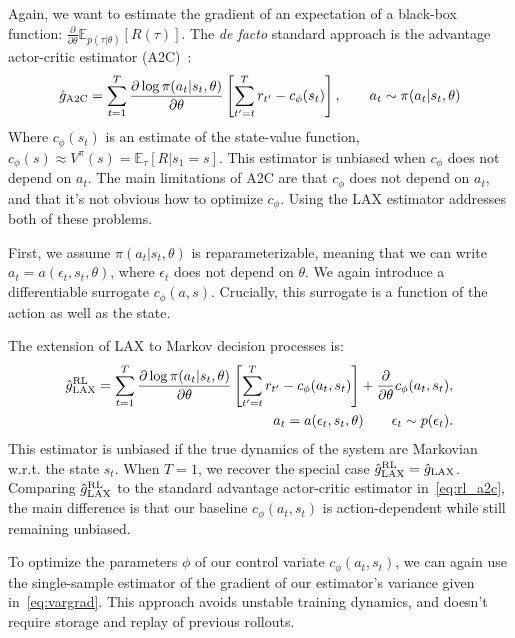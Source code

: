 \documentclass{article}
\newcommand{\E}{\mathbb{E}}
\newcommand{\LL}[1]{\frac{\partial \log \pi(a_{#1}| s_{#1}, \theta)}{\partial \theta}}
\newcommand{\PT}{\frac{\partial}{\partial \theta}}
\newcommand{\LAX}{{\textnormal{LAX}}}
\newcommand{\RL}{{\textnormal{RL}}}
\begin{document}
Again, we want to estimate the gradient of an expectation of a black-box function: $ \PT \E_{p(\tau|\theta)}[R(\tau)]$.
The \emph{de facto} standard approach is the advantage actor-critic estimator (A2C)~\citep{sutton2000policy}:
%
%
%
\begin{align}
\hat g_{\textnormal{A2C}} = \sum_{t=1}^{T} \LL{t} \left[ \sum_{t'=t}^{T} r_{t'} - c_\phi(s_t) \right], \qquad a_t \sim \pi(a_t | s_t, \theta)
\label{eq:rl_a2c}
\end{align}
%
Where $c_\phi(s_t)$ is an estimate of the state-value function, $c_\phi(s) \approx V^\pi(s) = \E_{\tau}[R|s_1=s].$
This estimator is unbiased when $c_\phi$ does not depend on $a_t$.
The main limitations of A2C are that $c_\phi$ does not depend on $a_t$, and that it's not obvious how to optimize $c_\phi$.
Using the \LAX{} estimator addresses both of these problems.

First, we assume $\pi(a_t|s_t, \theta)$ is reparameterizable, meaning that we can write $a_t = a(\epsilon_t, s_t, \theta)$, where $\epsilon_t$ does not depend on $\theta$.
We again introduce a differentiable surrogate $c_\phi(a,s)$.
Crucially, this surrogate is a function of the action as well as the state.

The extension of LAX to Markov decision processes is: 
%
\begin{align}
\hat g_\LAX^{\RL} = \sum_{t=1}^{T} \LL{t} \left[ \sum_{t'=t}^{T} r_{t'} - c_\phi(a_t,s_t) \right] +\frac{\partial}{\partial\theta} c_\phi(a_t, s_t), \\
a_t = a(\epsilon_t,s_t, \theta) \qquad \epsilon_t \sim p(\epsilon_t)\nonumber.
\label{eq:rl_est}
\end{align}
%
This estimator is unbiased if the true dynamics of the system are Markovian w.r.t. the state $s_t$.
When $T = 1$, we recover the special case ${\hat g_\LAX^{\RL} = \hat g_\LAX}$.
Comparing $\hat g_\LAX^{\RL}$ to the standard advantage actor-critic estimator in~\eqref{eq:rl_a2c}, the main difference is that our baseline $c_\phi(a_t, s_t)$ is action-dependent while still remaining unbiased.

To optimize the parameters $\phi$ of our control variate $c_\phi(a_t, s_t)$, we can again use the single-sample estimator of the gradient of our estimator's variance given in~\eqref{eq:vargrad}.
This approach avoids unstable training dynamics, and doesn't require storage and replay of previous rollouts.
\end{document}
